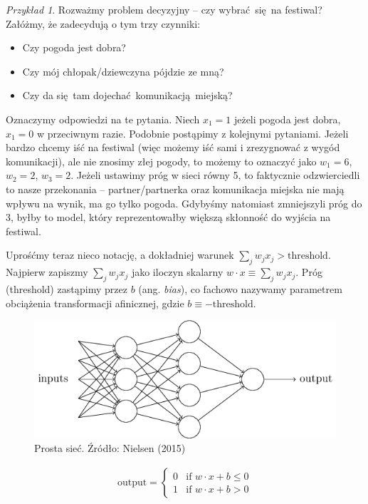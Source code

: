 \documentclass[10pt, oneside]{article}
\theoremstyle{remark}
\newtheorem*{example}{Przykład}
\begin{document}
\begin{example}
Rozważmy problem decyzyjny -- czy wybrać się na festiwal?
Załóżmy, że zadecydują o tym trzy czynniki:
\begin{itemize}
	\item Czy pogoda jest dobra?
	\item Czy mój chłopak/dziewczyna pójdzie ze mną?
	\item Czy da się tam dojechać komunikacją miejską?
\end{itemize}
Oznaczymy odpowiedzi na te pytania. Niech $x_1 = 1$ jeżeli pogoda jest dobra, $x_1 = 0$ w przeciwnym razie.
Podobnie postąpimy z kolejnymi pytaniami.
Jeżeli bardzo chcemy iść na festiwal (więc możemy iść sami i zrezygnować z wygód komunikacji), ale nie znosimy złej pogody, to możemy to oznaczyć jako $w_1=6$, $w_2=2$, $w_3=2$.
Jeżeli ustawimy próg w sieci równy 5, to faktycznie odzwierciedli to nasze przekonania -- partner/partnerka oraz komunikacja miejska nie mają wpływu na wynik, ma go tylko pogoda.
Gdybyśmy natomiast zmniejszyli próg do 3, byłby to model, który reprezentowałby większą skłonność do wyjścia na festiwal.
\end{example}

Uprośćmy teraz nieco notację, a dokładniej warunek $\sum_j w_j x_j > \mbox{threshold}$.
Najpierw zapiszmy $\sum_j w_j x_j$ jako iloczyn skalarny $w \cdot x \equiv \sum_j w_j x_j$.
Próg (threshold) zastąpimy przez $b$ (ang. \emph{bias}), co fachowo nazywamy parametrem obciążenia transformacji afinicznej, gdzie $b \equiv -\mbox{threshold}$.

\begin{figure}[htpb]
	\centering
	\includegraphics[width=.5\linewidth]{figures/tikz1}
	\caption{Prosta sieć. Źródło: Nielsen (2015)}
\end{figure}

\begin{eqnarray}
  \mbox{output} = \left\{ 
    \begin{array}{ll} 
      0 & \mbox{if } w\cdot x + b \leq 0 \\
      1 & \mbox{if } w\cdot x + b > 0
    \end{array}
  \right.
\end{eqnarray}
\end{document}
